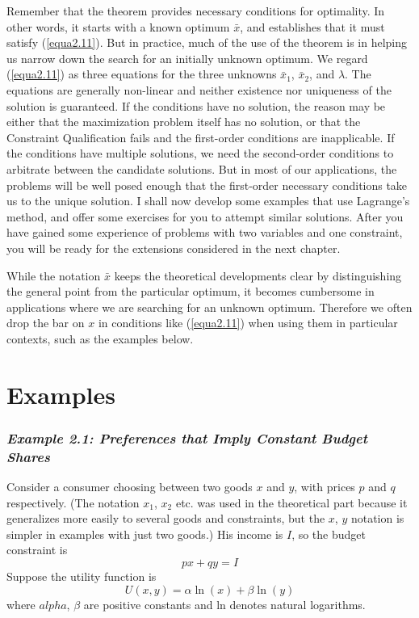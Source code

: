 Remember that the theorem provides necessary conditions for optimality. In other words, it starts with a known optimum $\bar{x}$, and establishes that it must satisfy (\ref{equa2.11}). But in practice, much of the use of the theorem is in helping us narrow down the search for an initially unknown optimum. We regard (\ref{equa2.11}) as three equations for the three unknowns $\bar{x}_1$, $\bar{x}_2$, and $\lambda$. The equations are generally non-linear and neither existence nor uniqueness of the solution is guaranteed. If the conditions have no solution, the reason may be either that the maximization problem itself has no solution, or that the Constraint Qualification fails and the first-order conditions are inapplicable. If the conditions have multiple solutions, we need the second-order conditions to arbitrate between the candidate solutions. But in most of our applications, the problems will be well posed enough that the first-order necessary conditions take us to the unique solution. I shall now develop some examples that use Lagrange's method, and offer some exercises for you to attempt similar solutions. After you have gained some experience of problems with two variables and one constraint, you will be ready for the extensions considered in the next chapter.

While the notation $\bar{x}$ keeps the theoretical developments clear by distinguishing the general point from the particular optimum, it becomes cumbersome in applications where we are searching for an unknown optimum. Therefore we often drop the bar on $x$ in conditions like (\ref{equa2.11}) when using them in particular contexts, such as the examples below.

\section*{Examples}

\subsubsection*{ \textit{Example 2.1: Preferences that Imply Constant Budget Shares} }

Consider a consumer choosing between two goods $x$ and $y$, with prices $p$ and $q$ respectively. (The notation $x_1$, $x_2$ etc. was used in the theoretical part because it generalizes more easily to several goods and constraints, but the $x$, $y$ notation is simpler in examples with just two goods.) His income is $I$, so the budget constraint is 
\begin{equation*}
px + qy =I
\end{equation*}
Suppose the utility function is 
\begin{equation} \label{equa2.12}
U(x,y ) = \alpha \ln(x) + \beta \ln(y)
\end{equation}
where $alpha$, $\beta$ are positive constants and ln denotes natural logarithms.

